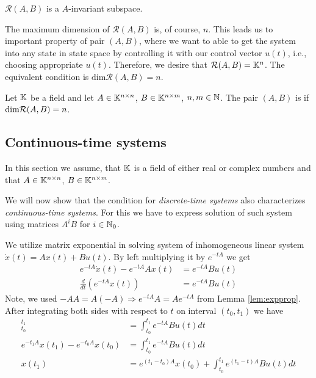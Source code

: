 \begin{remark}
	\label{rem:reachinv}
	$\mathcal{R}(A,B)$ is a $A$-invariant subspace.
\end{remark} 

The maximum dimension of $\mathcal{R}(A,B)$ is, of course, $n$. This leads us to important property of pair $(A,B)$, where we want to able to get the system into any state in state space by controlling it with our control vector $u(t)$, i.e., choosing appropriate $u(t)$. Therefore, we desire that $\mathcal{R}(A,B)=\mathbb{K}^n$. The equivalent condition is $\text{dim}\mathcal{R}(A,B)=n$.

\begin{definition}
	Let $\mathbb{K}$ be a field and let $A \in \mathbb{K}^{n \times n}$, $B \in \mathbb{K}^{n \times m}$, $n,m \in \mathbb{N}$. The pair $(A,B)$ is  if $\textnormal{dim}\mathcal{R}(A,B)=n$.
\end{definition}

\subsection{Continuous-time systems}

\begin{remark}
	In this section we assume, that $\mathbb{K}$ is a field of either real or complex numbers and that $A\in\mathbb{K}^{n\times n}$, $B\in\mathbb{K}^{n\times m}$.
\end{remark}

We will now show that the condition for \textit{discrete-time systems} also characterizes \textit{continuous-time systems}. For this we have to express solution of such system using matrices $A^iB$ for $i\in \mathbb{N}_0$. 

We utilize matrix exponential in solving system of inhomogeneous linear system $\dot{x}(t)=Ax(t)+Bu(t)$. By left multiplying it by $e^{-tA}$ we get
\begin{align*}
	e^{-tA}\dot{x}(t)-e^{-tA}Ax(t) &=e^{-tA}Bu(t) \\
	\frac{d}{dt} (e^{-tA}x(t)) &=e^{-tA}Bu(t) 
\end{align*}
Note, we used $-AA=A(-A)\Rightarrow e^{-tA}A=Ae^{-tA}$ from Lemma \ref{lem:expprop}. After integrating both sides with respect to $t$ on interval $(t_0,t_1)$ we have 
\begin{align*}
	[e^{-tA}x(t)]^{t_1}_{t_0}&=\int^{t_1}_{t_0}e^{-tA}Bu(t)dt \\
	e^{-t_1A}x(t_1)-e^{-t_0A}x(t_0)&=\int^{t_1}_{t_0}e^{-tA}Bu(t)dt \\
	x(t_1)&=e^{(t_1-t_0)A}x(t_0)+\int^{t_1}_{t_0}e^{(t_1-t)A}Bu(t)dt
\end{align*}

